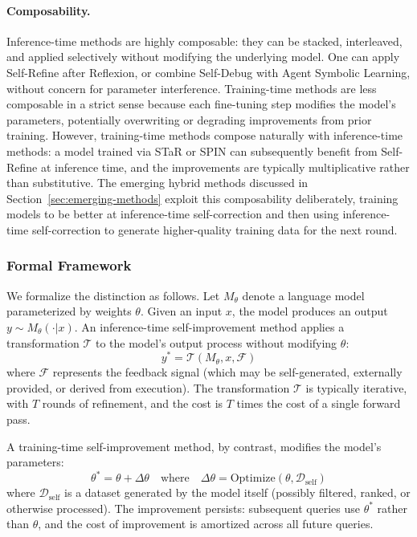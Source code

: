 \paragraph{Composability.}
Inference-time methods are highly composable: they can be stacked, interleaved, and applied selectively without modifying the underlying model. One can apply Self-Refine after Reflexion, or combine Self-Debug with Agent Symbolic Learning, without concern for parameter interference. Training-time methods are less composable in a strict sense because each fine-tuning step modifies the model's parameters, potentially overwriting or degrading improvements from prior training. However, training-time methods compose naturally with inference-time methods: a model trained via STaR or SPIN can subsequently benefit from Self-Refine at inference time, and the improvements are typically multiplicative rather than substitutive. The emerging hybrid methods discussed in Section~\ref{sec:emerging-methods} exploit this composability deliberately, training models to be better at inference-time self-correction and then using inference-time self-correction to generate higher-quality training data for the next round.


\subsubsection{Formal Framework}

We formalize the distinction as follows. Let $M_\theta$ denote a language model parameterized by weights $\theta$. Given an input $x$, the model produces an output $y \sim M_\theta(\cdot | x)$. An inference-time self-improvement method applies a transformation $\mathcal{T}$ to the model's output process without modifying $\theta$:
\begin{equation}
    y^{*} = \mathcal{T}(M_\theta, x, \mathcal{F})
    \label{eq:inference-improvement}
\end{equation}
where $\mathcal{F}$ represents the feedback signal (which may be self-generated, externally provided, or derived from execution). The transformation $\mathcal{T}$ is typically iterative, with $T$ rounds of refinement, and the cost is $T$ times the cost of a single forward pass.

A training-time self-improvement method, by contrast, modifies the model's parameters:
\begin{equation}
    \theta^{*} = \theta + \Delta\theta \quad \text{where} \quad \Delta\theta = \mathrm{Optimize}(\theta, \mathcal{D}_{\text{self}})
    \label{eq:training-improvement}
\end{equation}
where $\mathcal{D}_{\text{self}}$ is a dataset generated by the model itself (possibly filtered, ranked, or otherwise processed). The improvement persists: subsequent queries use $\theta^{*}$ rather than $\theta$, and the cost of improvement is amortized across all future queries.

